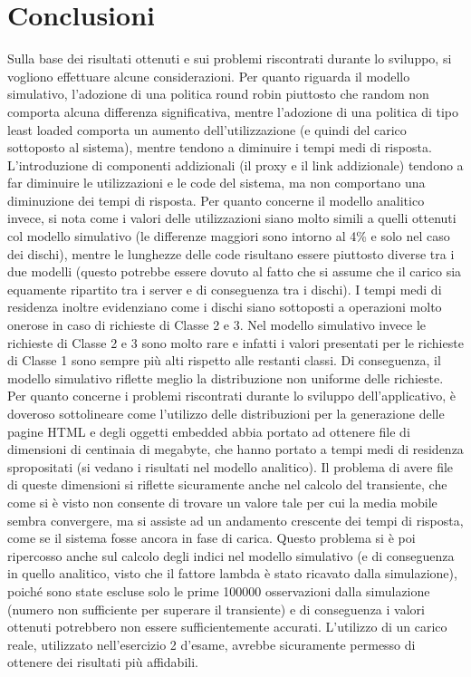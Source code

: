 \chapter{Conclusioni}
Sulla base dei risultati ottenuti e sui problemi riscontrati durante lo sviluppo, si vogliono effettuare alcune considerazioni.
Per quanto riguarda il modello simulativo, l'adozione di una politica round robin piuttosto che random non comporta alcuna differenza significativa, mentre l'adozione di una politica di tipo least loaded comporta un aumento dell'utilizzazione (e quindi del carico sottoposto al sistema), mentre tendono a diminuire i tempi medi di risposta. L'introduzione di componenti addizionali (il proxy e il link addizionale) tendono a far diminuire le utilizzazioni e le code del sistema, ma non comportano una diminuzione dei tempi di risposta. 
Per quanto concerne il modello analitico invece, si nota come i valori delle utilizzazioni siano molto simili a quelli ottenuti col modello simulativo (le differenze maggiori sono intorno al 4\% e solo nel caso dei dischi), mentre le lunghezze delle code risultano essere piuttosto diverse tra i due modelli (questo potrebbe essere dovuto al fatto che si assume che il carico sia equamente ripartito tra i server e di conseguenza tra i dischi). I tempi medi di residenza inoltre evidenziano come i dischi siano sottoposti a operazioni molto onerose in caso di richieste di Classe 2 e 3. Nel modello simulativo invece le richieste di Classe 2 e 3 sono molto rare e infatti i valori presentati per le richieste di Classe 1 sono sempre più alti rispetto alle restanti classi. Di conseguenza, il modello simulativo riflette meglio la distribuzione non uniforme delle richieste.
Per quanto concerne i problemi riscontrati durante lo sviluppo dell'applicativo, è doveroso sottolineare come l'utilizzo delle distribuzioni per la generazione delle pagine HTML e degli oggetti embedded abbia portato ad ottenere file di dimensioni di centinaia di megabyte, che hanno portato a  tempi medi di residenza spropositati (si vedano i risultati nel modello analitico). Il problema di avere file di queste dimensioni si riflette sicuramente anche nel calcolo del transiente, che come si è visto non consente di trovare un valore tale per cui la media mobile sembra convergere, ma si assiste ad un andamento crescente dei tempi di risposta, come se il sistema fosse ancora in fase di carica. Questo problema si è poi ripercosso anche sul calcolo degli indici nel modello simulativo (e di conseguenza in quello analitico, visto che il fattore lambda è stato ricavato dalla simulazione), poiché sono state escluse solo le prime 100000 osservazioni dalla simulazione (numero non sufficiente per superare il transiente) e di conseguenza i valori ottenuti potrebbero non essere sufficientemente accurati. L'utilizzo di un carico reale, utilizzato nell'esercizio 2 d'esame, avrebbe sicuramente permesso di ottenere dei risultati più affidabili. 
